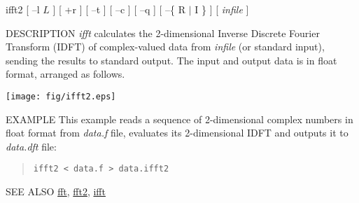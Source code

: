 \begin{synopsis}
\item[ifft2] [ --l $L$ ] [ +r ] [ --t ] [ --c ] [ --q ] 
             [ --\{ R $|$ I \} ] [ {\em infile} ]
\end{synopsis}

\begin{qsection}{DESCRIPTION}
{\em ifft} calculates the 2-dimensional Inverse Discrete Fourier Transform
(IDFT) of complex-valued data from {\em infile} (or standard input), 
sending the results to standard output.
The input and output data is in float format, arranged as follows.
\begin{center}
\leavevmode
\texttt{[image: fig/ifft2.eps]}
\end{center}
\end{qsection}

\begin{options}
\end{options}

\begin{qsection}{EXAMPLE}
This example reads a sequence of 2-dimensional complex numbers in float format
from {\em data.f} file, evaluates its 2-dimensional IDFT and outputs it to {\em
data.dft} file:
\begin{quote}
  \verb!ifft2 < data.f > data.ifft2!
\end{quote}
\end{qsection}

\begin{qsection}{SEE ALSO}
\hyperlink{fft}{fft},
\hyperlink{fft2}{fft2},
\hyperlink{ifft}{ifft}
\end{qsection}
